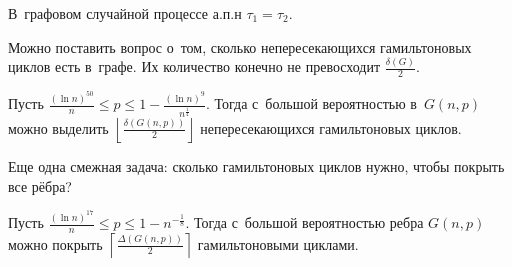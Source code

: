 \documentclass{article}
\begin{document}
\begin{theorem}
	В~графовом случайной процессе а.п.н $\tau_1 = \tau_2$.
\end{theorem}

Можно поставить вопрос о~том, сколько непересекающихся гамильтоновых циклов есть в~графе. Их
количество конечно не превосходит $\frac{\delta(G)}{2}$.

\begin{theorem}
	Пусть $\frac{(\ln n)^{50}}{n} \le p \le 1 - \frac{(\ln n)^9}{n^\frac{1}{4}}$. Тогда с~большой
	вероятностью в~$G(n, p)$ можно выделить $\left\lfloor \frac{\delta(G(n,p))}{2} \right\rfloor$
	непересекающихся гамильтоновых циклов.
\end{theorem}

Еще одна смежная задача: сколько гамильтоновых циклов нужно, чтобы покрыть все рёбра?

\begin{theorem}
	Пусть $\frac{(\ln n)^{17}}{n} \le p \le 1 - n^{-\frac{1}{8}}$. Тогда с~большой вероятностью ребра
	$G(n, p)$ можно покрыть $\left\lceil \frac{\Delta(G(n,p))}{2} \right\rceil$ гамильтоновыми
	циклами.
\end{theorem}
\end{document}
